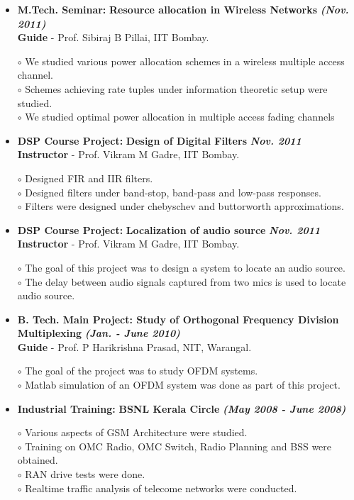 \documentclass[a4paper,10pt]{article}
\begin{document}
\begin{itemize}
 \item \textbf{M.Tech. Seminar:} \textbf{Resource allocation in Wireless Networks}  \textbf \emph{(Nov. 2011)}\\
        {\textbf{Guide} - Prof. Sibiraj B Pillai, IIT Bombay.   }
        
      $\circ$ We studied various power allocation schemes in a wireless multiple access channel. \\
      $\circ$ Schemes achieving rate tuples under information theoretic setup were studied. \\
      $\circ$ We studied optimal power allocation in multiple access fading channels
       
 \item \textbf{DSP Course Project:} \textbf{Design of Digital Filters} \textbf \emph{Nov. 2011}\\
	{\textbf{Instructor} - Prof. Vikram M Gadre, IIT Bombay. }
	
	$\circ$ Designed FIR and IIR filters. \\
	$\circ$ Designed filters under band-stop, band-pass and low-pass responses. \\
	$\circ$ Filters were designed under chebyschev and buttorworth approximations.
	
 \item \textbf{DSP Course Project:} \textbf{Localization of audio source} \textbf \emph{Nov. 2011}\\
	{\textbf{Instructor} - Prof. Vikram M Gadre, IIT Bombay. }
	
	$\circ$ The goal of this project was to design a system to locate an audio source. \\
	$\circ$ The delay between audio signals captured from two mics is used to locate audio source.

  \item \textbf{{B. Tech. Main Project}: Study of Orthogonal Frequency Division Multiplexing}  \textbf \emph{(Jan. - June 2010)}\\
        {\textbf{Guide} - Prof. P Harikrishna Prasad, NIT, Warangal. }
        
$\circ$ The goal of the project was to study OFDM systems. \\
$\circ$ Matlab simulation of an OFDM system was done as part of this project.

  \item \textbf{Industrial Training:} \textbf{BSNL Kerala Circle}  \textbf \emph{(May 2008 - June 2008)}        

  $\circ$ Various aspects of GSM Architecture were studied. \\
  $\circ$ Training on OMC Radio, OMC Switch, Radio Planning and BSS were obtained. \\
  $\circ$ RAN drive tests were done. \\
  $\circ$ Realtime traffic analysis of telecome networks were conducted.

 \end{itemize}
\end{document}
